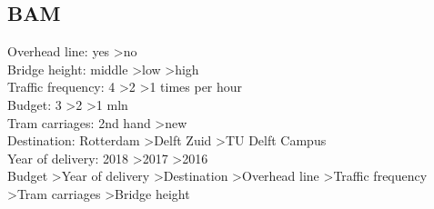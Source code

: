 \documentclass{article}
\begin{document}
\subsection{BAM}
Overhead line: yes \textgreater no \\
Bridge height: middle \textgreater low \textgreater high \\
Traffic frequency: 4 \textgreater 2 \textgreater 1 times per hour \\
Budget: 3 \textgreater 2 \textgreater 1 mln \\
Tram carriages: 2nd hand \textgreater new \\
Destination: Rotterdam \textgreater Delft Zuid \textgreater TU Delft Campus \\
Year of delivery: 2018 \textgreater 2017 \textgreater 2016 \\

Budget \textgreater Year of delivery \textgreater Destination \textgreater Overhead line \textgreater Traffic frequency \textgreater Tram carriages \textgreater Bridge height\\
\end{document}
